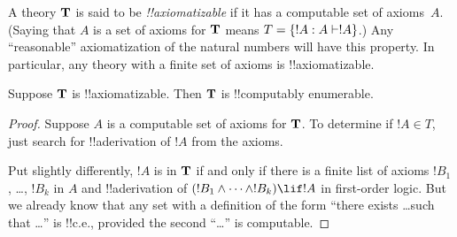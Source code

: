 \documentclass[../../../include/open-logic-section]{subfiles}
\begin{document}


A theory $\mathbf{T}$ is said to be \emph{!!{axiomatizable}} if it has a
computable set of axioms~$A$. (Saying that $A$ is a set of axioms for
$\mathbf{T}$ means $T = \Setabs{!A}{A \Proves !A}$.) Any ``reasonable''
axiomatization of the natural numbers will have this property. In
particular, any theory with a finite set of axioms is
!!{axiomatizable}.

\begin{lem}
Suppose $\mathbf{T}$ is !!{axiomatizable}. Then $\mathbf{T}$ is !!{computably
enumerable}.
\end{lem}

\begin{proof}
Suppose $A$ is a computable set of axioms for $\mathbf{T}$. To determine
if $!A \in T$, just search for !!a{derivation} of $!A$ from the axioms.

Put slightly differently, $!A$ is in $\mathbf{T}$ if and only if there is
a finite list of axioms $!B_1$, \dots, $!B_k$ in $A$ and !!a{derivation} of
$(!B_1 \land \dots \land !B_k) \lif !A$ in first-order logic.  But
we already know that any set with a definition of the form ``there
exists \dots such that \dots'' is !!{c.e.}, provided the second ``\dots''
is computable.
\end{proof}
\end{document}
